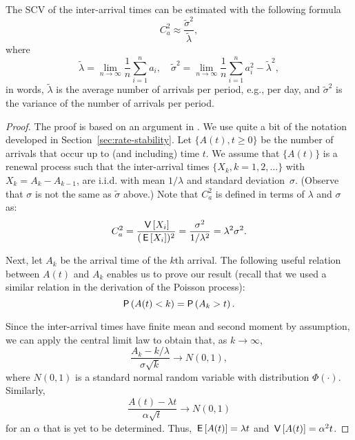 \begin{theorem} The SCV of the inter-arrival times can be estimated
  with the following formula
\begin{equation*}
C_a^2 \approx \frac{\tilde \sigma^2}{\tilde \lambda},
\end{equation*}
where 
\begin{equation*}
\tilde  \lambda = \lim_{n\to\infty} \frac 1n  \sum_{i=1}^n a_i,\quad  
\tilde  \sigma^2 = \lim_{n\to\infty} \frac 1 n \sum_{i=1}^n a_i^2 - \tilde \lambda^2,
\end{equation*}
in words, $\tilde \lambda$ is the average number of arrivals per
period, e.g., per day, and $\tilde \sigma^2 $ is the variance of the
number of arrivals per period.
\end{theorem}

\begin{proof}
  The proof is based on an argument in \cite{cox62:_renew_theor}. We
  use quite a bit of the notation developed in
  Section~\ref{sec:rate-stability}. Let $\{A(t), t\geq 0\}$ be the
  number of arrivals that occur up to (and including) time $t$. We
  assume that $\{A(t)\}$ is a renewal process such that the
  inter-arrival times $\{X_k, k=1, 2, \ldots\}$ with
  $X_k = A_{k}-A_{k-1}$, are i.i.d. with mean $1/\lambda$ and standard
  deviation~$\sigma$. (Observe that $\sigma$ is not the same as
  $\tilde \sigma$ above.) Note that $C_a^2$ is defined in terms of
  $\lambda$ and $\sigma$ as:
\begin{equation*}
C_a^2 = \frac{\,\mathsf{V}\left[X_i\right]}{(\,\mathsf{E}\left[X_i\right])^2} = \frac{\sigma^2}{1/\lambda^2} = \lambda^2 \sigma^2.
\end{equation*}

Next, let $A_k$ be the arrival time of the $k$th arrival. The
following useful relation between $A(t)$ and $A_k$ enables us to prove
our result (recall that we used a similar relation in the derivation
of the Poisson process):
\begin{equation*}
\P{A(t) < k} = \P{A_k > t}.
\end{equation*}

Since the inter-arrival times have finite mean and second moment by
assumption, we can apply the central limit law to obtain that, as
$k\to\infty$,
\begin{equation*}
\frac{A_k -k/\lambda}{\sigma \sqrt k} \to N(0,1),
\end{equation*}
where $N(0,1)$ is a standard normal random variable with
distribution $\Phi(\cdot)$.  Similarly,
%
\begin{equation*}
\frac{A(t) -\lambda t}{\alpha \sqrt t} \to N(0,1)
\end{equation*}
for an $\alpha$ that is yet to be determined. Thus,
$\,\mathsf{E}\left[A(t)\right] = \lambda t$ and $\,\mathsf{V}\left[A(t)\right]=\alpha^2 t$.


\end{proof}
